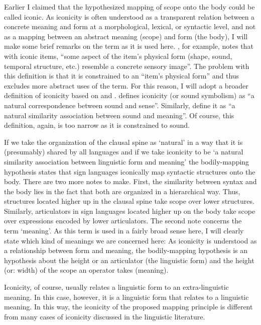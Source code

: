 \begin{theo}\label{iconicity}
\vspace{-0.3cm}\linebreak
\noindent Earlier I claimed that the hypothesized mapping of scope onto the body could be called iconic. As iconicity is often understood as a transparent relation between a concrete meaning and form at a morphological, lexical, or syntactic level, and not as a mapping between an abstract meaning (scope) and form (the body), I will make some brief remarks on the term as it is used here. \citet[20]{taub2004iconicity}, for example, notes that with iconic items, ``some aspect of the item's physical form (shape, sound, temporal structure, etc.) resemble a concrete sensory image''. The problem with this definition is that it is constrained to an ``item's physical form'' and thus excludes more abstract uses of the term. For this reason, I will adopt a broader definition of iconicity based on \citet{jespersen1922language} and \citet{jakobsonwaugh1979soundshape}. \citet[396]{jespersen1922language} defines iconicity (or sound symbolism)  as ``a natural correspondence between sound and sense''. Similarly, \citet[178]{jakobsonwaugh1979soundshape} define it as ``a natural similarity association between sound and meaning''. Of course, this definition, again, is too narrow as it is constrained to sound. 

If we take the organization of the clausal spine as `natural' in a way that it is (presumably) shared by all languages and if we take iconicity to be `a natural similarity association between linguistic form and meaning' the bodily-mapping hypothesis states that sign languages iconically map syntactic structures onto the body. There are two more notes to make. First, the similarity between syntax and the body lies in the fact that both are organized in a hierarchical way. Thus, structures located higher up in the clausal spine take scope over lower structures. Similarly, articulators in sign languages located higher up on the body take scope over expressions encoded by lower articulators. The second note concerns the term `meaning'. As this term is used in a fairly broad sense here, I will clearly state which kind of meanings we are concerned here: As iconicity is understood as a relationship between form and meaning, the bodily-mapping hypothesis is an hypothesis about the height or an articulator (the linguistic form) and the height (or: width) of the scope an operator takes (meaning).

Iconicity, of course, usually relates a linguistic form to an extra-linguistic meaning. In this case, however, it is a linguistic form that relates to a linguistic meaning. In this way, the iconicity of the proposed mapping principle is different from many cases of iconicity discussed in the linguistic literature.



\end{theo}


